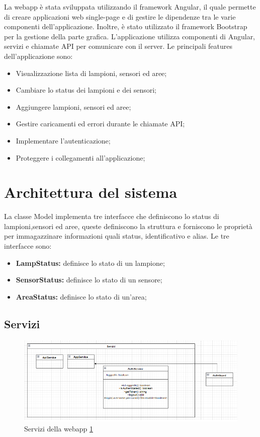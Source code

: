 La webapp è stata sviluppata utilizzando il framework Angular, il quale permette di creare applicazioni web single-page e di gestire le dipendenze tra le varie componenti dell'applicazione. Inoltre, è stato utilizzato il framework Bootstrap per la gestione della parte grafica. L'applicazione utilizza componenti di Angular, servizi e chiamate API per comunicare con il server. Le principali features dell'applicazione sono:
\begin{itemize}
    \item Visualizzazione lista di lampioni, sensori ed aree;
    \item Cambiare lo status dei lampioni e dei sensori;
    \item Aggiungere lampioni, sensori ed aree;
    \item Gestire caricamenti ed errori durante le chiamate API;
    \item Implementare l'autenticazione;
    \item Proteggere i collegamenti all'applicazione; 
\end{itemize} 

\section{Architettura del sistema}

La classe Model implementa tre interfacce che definiscono lo status di lampioni,sensori ed aree, queste definiscono la struttura e forniscono le proprietà per immagazzinare informazioni quali status, identificativo e alias. Le tre interfacce sono:
\begin{itemize}
    \item \textbf{LampStatus:} definisce lo stato di un lampione;
    \item \textbf{SensorStatus:} definisce lo stato di un sensore;
    \item \textbf{AreaStatus:} definisce lo stato di un'area;
\end{itemize}

\subsection{Servizi}

\begin{figure}[h]
    \centering
    \includegraphics[width=\textwidth]{img/services_webapp.png}
    \caption{Servizi della webapp \ref{fig:services_webapp}}
    \label{fig:services_webapp}
\end{figure}

